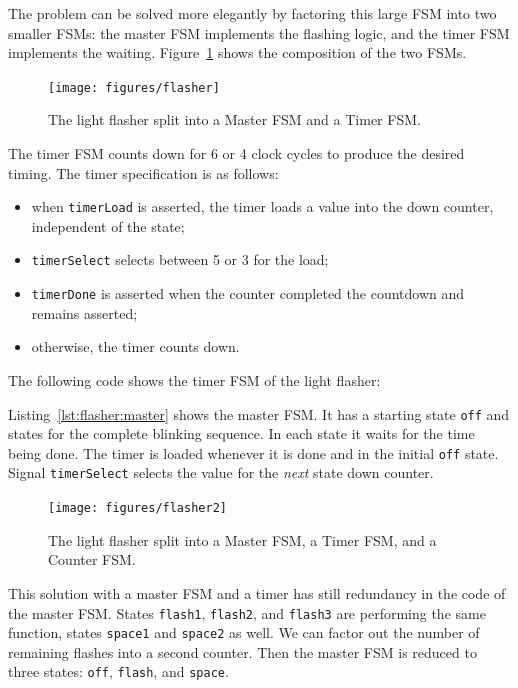 \documentclass[%
    10pt,
    headinclude, footexclude,
    openright, %
    notitlepage,
    cleardoubleempty,
    headsepline,
    pointlessnumbers,
    bibtotoc, idxtotoc,
    ]{scrbook}
\newcommand{\code}[1]{{\lstinline[basicstyle=\small\ttfamily]{#1}}}
\begin{document}
The problem can be solved more elegantly by factoring this large FSM into
two smaller FSMs: the master FSM implements the flashing logic, and the timer FSM
implements the waiting. Figure~\ref{fig:flasher} shows the composition of
the two FSMs.

\begin{figure}
  \centering
  \texttt{[image: figures/flasher]}
  \caption{The light flasher split into a Master FSM and a Timer FSM.}
  \label{fig:flasher}
\end{figure}

The timer FSM counts down for 6 or 4 clock cycles to produce the desired timing.
The timer specification is as follows:

\begin{itemize}
\item when \code{timerLoad} is asserted, the timer loads a value into the down counter,
independent of the state;
\item \code{timerSelect} selects between 5 or 3 for the load;
\item \code{timerDone} is asserted when the counter completed the countdown
and remains asserted;
\item otherwise, the timer counts down.
\end{itemize}

\noindent The following code shows the timer FSM of the light flasher:


\noindent Listing~\ref{lst:flasher:master} shows the master FSM. It has a starting
state \code{off} and states for the complete blinking sequence. In each state it
waits for the time being done. The timer is loaded whenever it is done and in the
initial \code{off} state. Signal \code{timerSelect} selects the value for the \emph{next}
state down counter.


\begin{figure}
  \centering
  \texttt{[image: figures/flasher2]}
  \caption{The light flasher split into a Master FSM, a Timer FSM, and a Counter FSM.}
  \label{fig:flasher2}
\end{figure}

This solution with a master FSM and a timer has still redundancy in the code
of the master FSM. States \code{flash1}, \code{flash2}, and \code{flash3}
are performing the same function, states \code{space1} and \code{space2} as well.
We can factor out the number of remaining flashes into a second counter.
Then the master FSM is reduced to three states: \code{off}, \code{flash},
and \code{space}.
\end{document}
